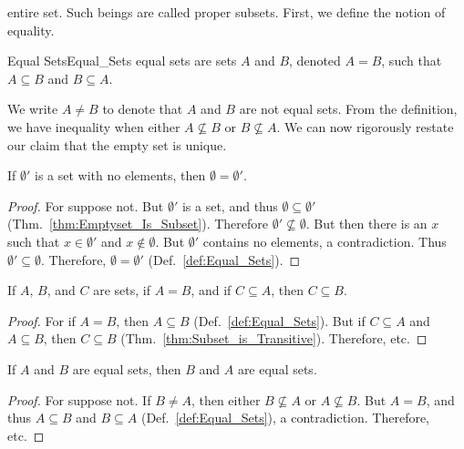             entire set. Such beings are called proper subsets. First, we
            define the notion of equality.
            \begin{ldefinition}{Equal Sets}{Equal_Sets}
                \Glspl{equal set} are sets $A$ and $B$, denoted $A=B$, such
                that $A\subseteq{B}$ and $B\subseteq{A}$.
            \end{ldefinition}
            We write $A\ne{B}$ to denote that $A$ and $B$ are not equal sets.
            From the definition, we have inequality when either
            $A\nsubseteq{B}$ or $B\nsubseteq{A}$. We can now rigorously restate
            our claim that the empty set is unique.
            \begin{theorem}
                If $\emptyset'$ is a set with no elements,
                then $\emptyset=\emptyset'$.
            \end{theorem}
            \begin{proof}
                For suppose not. But $\emptyset'$ is a set, and thus
                $\emptyset\subseteq\emptyset'$
                (Thm.~\ref{thm:Emptyset_Is_Subset}). Therefore
                $\emptyset'\nsubseteq\emptyset$. But then there is an $x$ such
                that $x\in\emptyset'$ and $x\notin\emptyset$. But $\emptyset'$
                contains no elements, a contradiction. Thus
                $\emptyset'\subseteq\emptyset$. Therefore,
                $\emptyset=\emptyset'$ (Def.~\ref{def:Equal_Sets}).
            \end{proof}
            \begin{theorem}
                \label{thm:Subsets_of_Equal_Sets}%
                If $A$, $B$, and $C$ are sets, if $A=B$, and if
                $C\subseteq{A}$, then $C\subseteq{B}$.
            \end{theorem}
            \begin{proof}
                For if $A=B$, then $A\subseteq{B}$ (Def.~\ref{def:Equal_Sets}).
                But if $C\subseteq{A}$ and $A\subseteq{B}$, then $C\subseteq{B}$
                (Thm.~\ref{thm:Subset_is_Transitive}). Therefore, etc.
            \end{proof}
            \begin{theorem}
                \label{thm:Equality_Symmetric}%
                If $A$ and $B$ are equal sets, then $B$ and
                $A$ are equal sets.
            \end{theorem}
            \begin{proof}
                For suppose not. If $B\ne{A}$, then either
                $B\nsubseteq{A}$ or $A\nsubseteq{B}$.
                But $A=B$, and thus $A\subseteq{B}$  and
                $B\subseteq{A}$ (Def.~\ref{def:Equal_Sets}),
                a contradiction. Therefore, etc.
            \end{proof}
